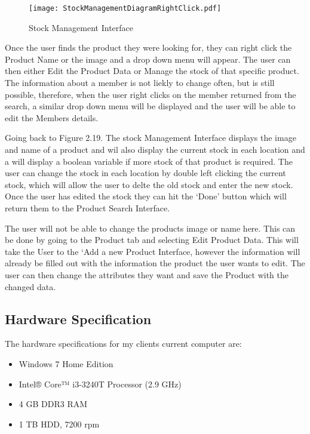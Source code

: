 \begin{figure}[H]
\caption{Stock Management Interface} \label{fig:Stock Management Interface}
\hfill\texttt{[image: StockManagementDiagramRightClick.pdf]}\hspace*{\fill}
\end{figure}

Once the user finds the product they were looking for, they can right click the Product Name or the image and a drop down menu will appear. The user can then either Edit the Product Data or Manage the stock of that specific product. The information about a member is not liekly to change often, but is still possible, therefore, when the user right clicks on the member returned from the search, a similar drop down menu will be displayed and the user will be able to edit the Members details. \par

Going back to Figure 2.19. The stock Management Interface displays the image and name of a product and wil also display the current stock in each location and a will display a boolean variable if more stock of that product is required. The user can change the stock in each location by double left clicking the current stock, which will allow the user to delte the old stock and enter the new stock. Once the user has edited the stock they can hit the `Done' button which will return them to the Product Search Interface.\par

The user will not be able to change the products image or name here. This can be done by going to the Product tab and selecting Edit Product Data. This will take the User to the `Add a new Product Interface, however the information will already be filled out with the information the product the user wants to edit. The user can then change the attributes they want and save the Product with the changed data. 

\subsection{Hardware Specification}
	
The hardware specifications for my clients current computer are: \par

\begin{itemize}
\item Windows 7 Home Edition
\item Intel® Core™ i3-3240T Processor (2.9 GHz)
\item 4 GB DDR3 RAM
\item 1 TB HDD, 7200 rpm
\end{itemize}




